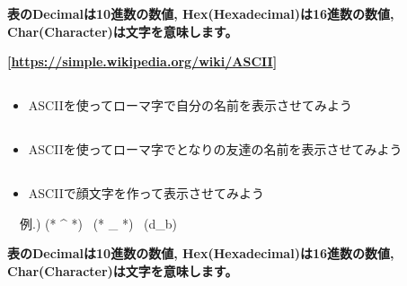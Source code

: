 \bigskip


\bigskip

{\bfseries
表のDecimalは10進数の数値,
Hex(Hexadecimal)は16進数の数値,
Char(Character)は文字を意味します。}

{\bfseries
[\url{https://simple.wikipedia.org/wiki/ASCII}]}

\clearpage\subsection*{\theQuestion\label{Q:myName}}
\begin{itemize}
\item
ASCIIを使ってローマ字で自分の名前を表示させてみよう
\end{itemize}
\subsection*{\theQuestion\label{Q:friendName}}
\begin{itemize}
\item
ASCIIを使ってローマ字でとなりの友達の名前を表示させてみよう
\end{itemize}
\subsection*{\theQuestion\label{Q:emoticon}}
\begin{itemize}
\item
ASCIIで顔文字を作って表示させてみよう
\end{itemize}
\ \ 例.) (* \^{} *) \ (* \_ *) \ (d\_b)


\bigskip

{\bfseries
表のDecimalは10進数の数値,
Hex(Hexadecimal)は16進数の数値,
Char(Character)は文字を意味します。}

